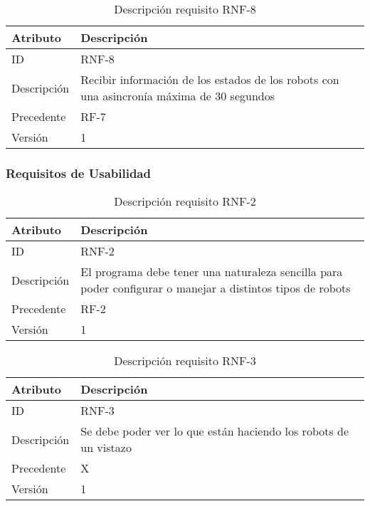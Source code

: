 \begin{table}[H]
    \label{tab:reqNF9}
 	\caption{Descripción requisito RNF-8}
	\centering

	\begin{tabular}{C{3cm}|C{12cm}}
 		\toprule
 		\textbf{Atributo} & \textbf{Descripción} \\
 		\midrule
 	    ID & RNF-8 \\
 	    Descripción & Recibir información de los estados de los robots con una asincronía máxima de 30 segundos \\
 	    Precedente & RF-7 \\
 	    Versión & 1 \\
 		\bottomrule
 		\end{tabular}
\end{table}


\subsubsection{Requisitos de Usabilidad}

\begin{table}[H]
    \label{tab:reqNF1}
 	\caption{Descripción requisito RNF-2}
	\centering

	\begin{tabular}{C{3cm}|C{12cm}}
 		\toprule
 		\textbf{Atributo} & \textbf{Descripción} \\
 		\midrule
 	    ID & RNF-2 \\
 	    Descripción & El programa debe tener una naturaleza sencilla para poder configurar o manejar a distintos tipos de robots\\
 	    Precedente & RF-2 \\
 	    Versión & 1 \\
 		\bottomrule
 		\end{tabular}
\end{table}
\begin{table}[H]
    \label{tab:reqNF1}
 	\caption{Descripción requisito RNF-3}
	\centering

	\begin{tabular}{C{3cm}|C{12cm}}
 		\toprule
 		\textbf{Atributo} & \textbf{Descripción} \\
 		\midrule
 	    ID & RNF-3 \\
 	    Descripción & Se debe poder ver lo que están haciendo los robots de un vistazo \\
 	    Precedente & X \\
 	    Versión & 1 \\
 		\bottomrule
 		\end{tabular}
\end{table}

